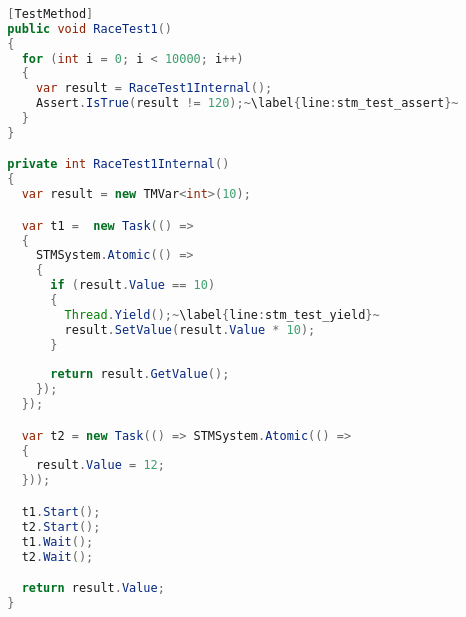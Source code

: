 \begin{lstlisting}[label=lst:stm_race_test,
  caption={RaceTest1},
  language=Java,  
  showspaces=false,
  showtabs=false,
  breaklines=true,
  showstringspaces=false,
  breakatwhitespace=true,
  escapechar=~,
  commentstyle=\color{greencomments},
  keywordstyle=\color{bluekeywords},
  stringstyle=\color{redstrings},
  morekeywords={atomic, retry, orelse, var, get, set, ref, out, Test}]  % Start your code-block
  
  [TestMethod]
  public void RaceTest1()
  {
    for (int i = 0; i < 10000; i++)
    {
      var result = RaceTest1Internal();
      Assert.IsTrue(result != 120);~\label{line:stm_test_assert}~
    }
  }

  private int RaceTest1Internal()
  {
    var result = new TMVar<int>(10);

    var t1 =  new Task(() =>
    {
      STMSystem.Atomic(() =>
      {
        if (result.Value == 10)
        {
          Thread.Yield();~\label{line:stm_test_yield}~
          result.SetValue(result.Value * 10);
        }
      
        return result.GetValue();
      });
    });

    var t2 = new Task(() => STMSystem.Atomic(() => 
    {
      result.Value = 12;
    }));

    t1.Start();
    t2.Start();
    t1.Wait();
    t2.Wait();

    return result.Value;
  }
\end{lstlisting}

\worksheetend